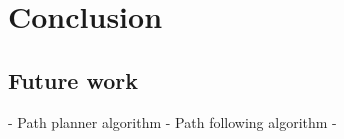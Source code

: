 \chapter{Conclusion}\label{conclusion}


\section{Future work}

- Path planner algorithm
- Path following algorithm
- 